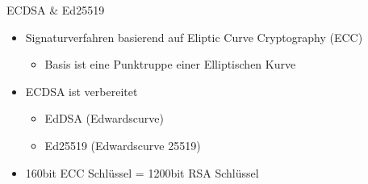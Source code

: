\documentclass[
  11 pt,
  ignorenonframetext,
  aspectratio=43,
]{beamer}
\providecommand{\tightlist}{%
  \setlength{\itemsep}{0pt}\setlength{\parskip}{0pt}}
\begin{document}
\begin{frame}{ECDSA \& Ed25519}
\protect\hypertarget{ecdsa-ed25519}{}
\begin{itemize}
\tightlist
\item
  Signaturverfahren basierend auf Eliptic Curve Cryptography (ECC)

  \begin{itemize}
  \tightlist
  \item
    Basis ist eine Punktruppe einer Elliptischen Kurve
  \end{itemize}
\end{itemize}

\pause

\begin{itemize}
\item
  ECDSA ist verbereitet

  \pause

  \begin{itemize}
  \tightlist
  \item
    EdDSA (Edwardscurve)
  \end{itemize}

  \pause

  \begin{itemize}
  \tightlist
  \item
    Ed25519 (Edwardscurve 25519)
  \end{itemize}

  \pause
\item
  160bit ECC Schlüssel = 1200bit RSA Schlüssel

  \pause

\end{itemize}
\end{frame}
\end{document}
